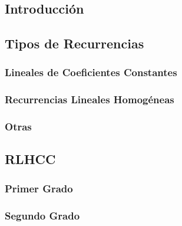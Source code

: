 \subsection{Introducción}
\subsection{Tipos de Recurrencias}
\subsubsection{Lineales de Coeficientes Constantes}
\subsubsection{Recurrencias Lineales Homogéneas}
\subsubsection{Otras}
\subsection{RLHCC}
\subsubsection{Primer Grado}
\subsubsection{Segundo Grado}